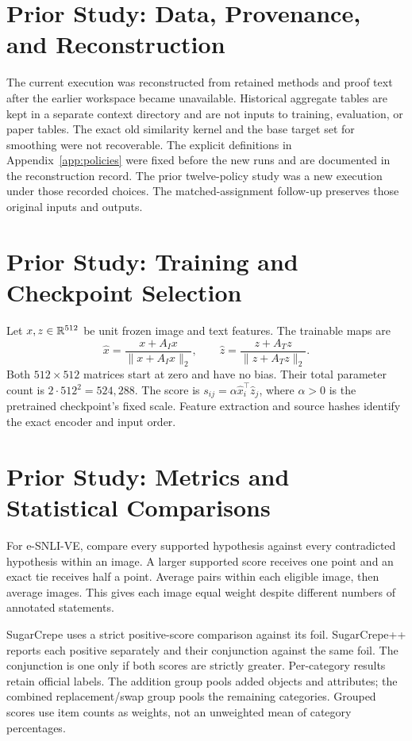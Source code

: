 \section{Prior Study: Data, Provenance, and Reconstruction}
\label{app:provenance}
The current execution was reconstructed from retained methods and proof text after the earlier workspace became unavailable. Historical aggregate tables are kept in a separate context directory and are not inputs to training, evaluation, or paper tables. The exact old similarity kernel and the base target set for smoothing were not recoverable. The explicit definitions in Appendix~\ref{app:policies} were fixed before the new runs and are documented in the reconstruction record. The prior twelve-policy study was a new execution under those recorded choices. The matched-assignment follow-up preserves those original inputs and outputs.



\section{Prior Study: Training and Checkpoint Selection}
\label{app:training}
Let $x,z\in\mathbb{R}^{512}$ be unit frozen image and text features. The trainable maps are
\begin{equation}
\widehat x=\frac{x+A_Ix}{\|x+A_Ix\|_2},\qquad
\widehat z=\frac{z+A_Tz}{\|z+A_Tz\|_2}.
\end{equation}
Both $512\times512$ matrices start at zero and have no bias. Their total parameter count is $2\cdot512^2=524{,}288$. The score is $s_{ij}=\alpha\widehat x_i^\top\widehat z_j$, where $\alpha>0$ is the pretrained checkpoint's fixed scale. Feature extraction and source hashes identify the exact encoder and input order.



\section{Prior Study: Metrics and Statistical Comparisons}
\label{app:metrics}
For e-SNLI-VE, compare every supported hypothesis against every contradicted hypothesis within an image. A larger supported score receives one point and an exact tie receives half a point. Average pairs within each eligible image, then average images. This gives each image equal weight despite different numbers of annotated statements.

SugarCrepe uses a strict positive-score comparison against its foil. SugarCrepe++ reports each positive separately and their conjunction against the same foil. The conjunction is one only if both scores are strictly greater. Per-category results retain official labels. The addition group pools added objects and attributes; the combined replacement/swap group pools the remaining categories. Grouped scores use item counts as weights, not an unweighted mean of category percentages.


